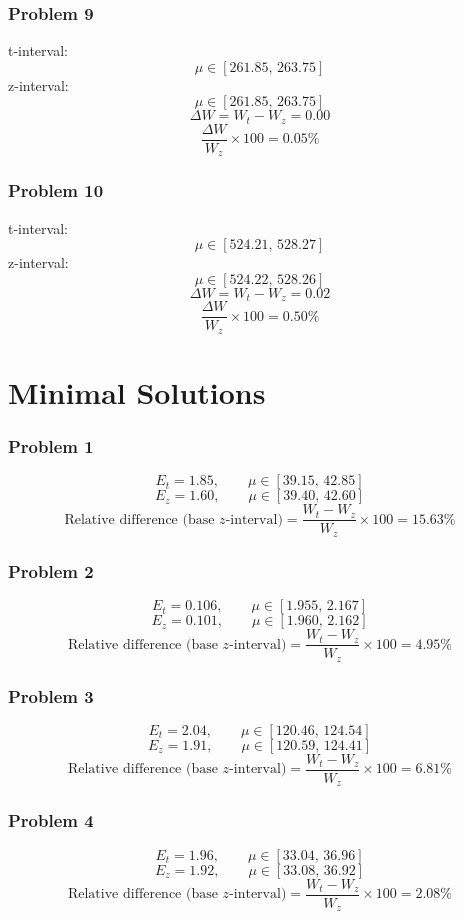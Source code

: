 	\section{Problem 9}
	t-interval:
	\[
	\mu \in [261.85,\,263.75]
	\]
	z-interval:
	\[
	\mu \in [261.85,\,263.75]
	\]
	\[
	\Delta W = W_t - W_z = 0.00
	\]
	\[
	\frac{\Delta W}{W_z}\times 100 = 0.05\%
	\]

	\section{Problem 10}
	t-interval:
	\[
	\mu \in [524.21,\,528.27]
	\]
	z-interval:
	\[
	\mu \in [524.22,\,528.26]
	\]
	\[
	\Delta W = W_t - W_z = 0.02
	\]
	\[
	\frac{\Delta W}{W_z}\times 100 = 0.50\%
	\]


\part{Minimal Solutions}
\section*{Problem 1}
\[
E_t = 1.85,\qquad \mu \in[39.15,\,42.85]
\]
\[
E_z = 1.60,\qquad \mu \in[39.40,\,42.60]
\]
\[
\text{Relative difference (base }z\text{-interval)}=\frac{W_t-W_z}{W_z}\times 100 = 15.63\%
\]

\section*{Problem 2}
\[
E_t = 0.106,\qquad \mu \in[1.955,\,2.167]
\]
\[
E_z = 0.101,\qquad \mu \in[1.960,\,2.162]
\]
\[
\text{Relative difference (base }z\text{-interval)}=\frac{W_t-W_z}{W_z}\times 100 = 4.95\%
\]

\section*{Problem 3}
\[
E_t = 2.04,\qquad \mu \in[120.46,\,124.54]
\]
\[
E_z = 1.91,\qquad \mu \in[120.59,\,124.41]
\]
\[
\text{Relative difference (base }z\text{-interval)}=\frac{W_t-W_z}{W_z}\times 100 = 6.81\%
\]

\section*{Problem 4}
\[
E_t = 1.96,\qquad \mu \in[33.04,\,36.96]
\]
\[
E_z = 1.92,\qquad \mu \in[33.08,\,36.92]
\]
\[
\text{Relative difference (base }z\text{-interval)}=\frac{W_t-W_z}{W_z}\times 100 = 2.08\%
\]

